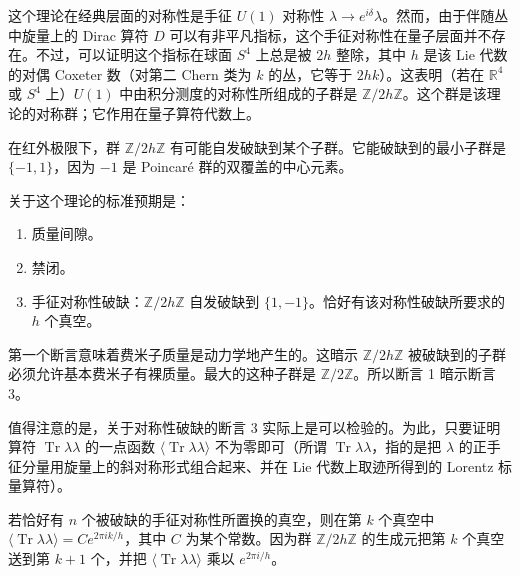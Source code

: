 这个理论在经典层面的对称性是手征 $U(1)$ 对称性 $\lambda\to e^{i\delta}\lambda$。然而，由于伴随丛中旋量上的 Dirac 算符 $D$ 可以有非平凡指标，这个手征对称性在量子层面并不存在。不过，可以证明这个指标在球面 $S^4$ 上总是被 $2h$ 整除，其中 $h$ 是该 Lie 代数的对偶 Coxeter 数（对第二 Chern 类为 $k$ 的丛，它等于 $2hk$）。这表明（若在 $\mathbb{R}^4$ 或 $S^4$ 上）$U(1)$ 中由积分测度的对称性所组成的子群是 $\mathbb{Z}/2h\mathbb{Z}$。这个群是该理论的对称群；它作用在量子算符代数上。

在红外极限下，群 $\mathbb{Z}/2h\mathbb{Z}$ 有可能自发破缺到某个子群。它能破缺到的最小子群是 $\{-1,1\}$，因为 $-1$ 是 Poincaré 群的双覆盖的中心元素。

关于这个理论的标准预期是：
\begin{enumerate}
  \item 质量间隙。
  \item 禁闭。
  \item 手征对称性破缺：$\mathbb{Z}/2h\mathbb{Z}$ 自发破缺到 $\{1,-1\}$。恰好有该对称性破缺所要求的 $h$ 个真空。
\end{enumerate}

第一个断言意味着费米子质量是动力学地产生的。这暗示 $\mathbb{Z}/2h\mathbb{Z}$ 被破缺到的子群必须允许基本费米子有裸质量。最大的这种子群是 $\mathbb{Z}/2\mathbb{Z}$。所以断言 1 暗示断言 3。

值得注意的是，关于对称性破缺的断言 3 实际上是可以检验的。为此，只要证明算符 $\operatorname{Tr}\lambda\lambda$ 的一点函数 $\langle\operatorname{Tr}\lambda\lambda\rangle$ 不为零即可（所谓 $\operatorname{Tr}\lambda\lambda$，指的是把 $\lambda$ 的正手征分量用旋量上的斜对称形式组合起来、并在 Lie 代数上取迹所得到的 Lorentz 标量算符）。

若恰好有 $n$ 个被破缺的手征对称性所置换的真空，则在第 $k$ 个真空中 $\langle\operatorname{Tr}\lambda\lambda\rangle=Ce^{2\pi ik/h}$，其中 $C$ 为某个常数。因为群 $\mathbb{Z}/2h\mathbb{Z}$ 的生成元把第 $k$ 个真空送到第 $k+1$ 个，并把 $\langle\operatorname{Tr}\lambda\lambda\rangle$ 乘以 $e^{2\pi i/h}$。


